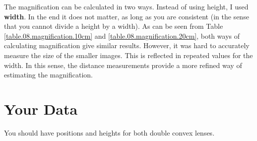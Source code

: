 The magnification can be calculated in two ways. Instead of using height, I used \textbf{width}. In the end it does not matter, as long as you are consistent (in the sense that you cannot divide a height by a width). As can be seen from Table \ref{table.08.magnification.10cm} and \ref{table.08.magnification.20cm}, both ways of calculating magnification give similar results. However, it was hard to accurately measure the size of the smaller images. This is reflected in repeated values for the width. In this sense, the distance measurements provide a more refined way of estimating the magnification.
%
\section{Your Data}
%
You should have positions and heights for both double convex lenses.
%
%
\newpage
